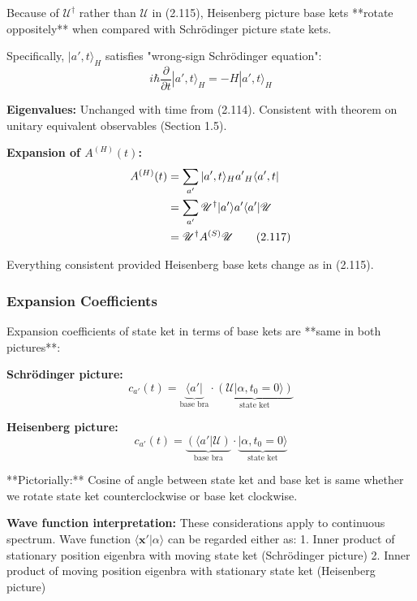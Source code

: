 \documentclass[11pt,a4paper]{article}
\begin{document}
Because of $\mathscr{U}^\dagger$ rather than $\mathscr{U}$ in (2.115), Heisenberg picture base kets **rotate oppositely** when compared with Schrödinger picture state kets.

Specifically, $|a', t\rangle_H$ satisfies "wrong-sign Schrödinger equation":
\begin{equation}
i\hbar\frac{\partial}{\partial t}|a', t\rangle_H = -H|a', t\rangle_H
\tag{2.116}
\end{equation}

\textbf{Eigenvalues:} Unchanged with time from (2.114). Consistent with theorem on unitary equivalent observables (Section 1.5).

\textbf{Expansion of $A^{(H)}(t)$:}
\begin{align}
A^{(H)}(t) &= \sum_{a'}|a', t\rangle_H a'{}_{H}\langle a', t| \notag \\
&= \sum_{a'}\mathscr{U}^\dagger|a'\rangle a'\langle a'|\mathscr{U} \notag \\
&= \mathscr{U}^\dagger A^{(S)}\mathscr{U}
\tag{2.117}
\end{align}

Everything consistent provided Heisenberg base kets change as in (2.115).

\subsubsection{Expansion Coefficients}

Expansion coefficients of state ket in terms of base kets are **same in both pictures**:

\textbf{Schrödinger picture:}
\begin{equation}
c_{a'}(t) = \underbrace{\langle a'|}_{\text{base bra}} \cdot \underbrace{(\mathscr{U}|\alpha, t_0 = 0\rangle)}_{\text{state ket}}
\tag{2.118a}
\end{equation}

\textbf{Heisenberg picture:}
\begin{equation}
c_{a'}(t) = \underbrace{(\langle a'|\mathscr{U})}_{\text{base bra}} \cdot \underbrace{|\alpha, t_0 = 0\rangle}_{\text{state ket}}
\tag{2.118b}
\end{equation}

**Pictorially:** Cosine of angle between state ket and base ket is same whether we rotate state ket counterclockwise or base ket clockwise.

\textbf{Wave function interpretation:} These considerations apply to continuous spectrum. Wave function $\langle\mathbf{x}'|\alpha\rangle$ can be regarded either as:
1. Inner product of stationary position eigenbra with moving state ket (Schrödinger picture)
2. Inner product of moving position eigenbra with stationary state ket (Heisenberg picture)
\end{document}
